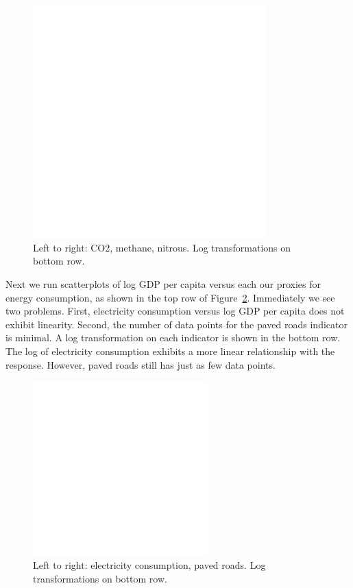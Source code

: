 \documentclass[11pt]{article}
\begin{document}
\begin{figure}[!ht]
  \centering
  \includegraphics[width=0.8\textwidth]{images/climate_model_scatter_pollution}
  \caption{\label{climate_model_scatter_pollution}Left to right: CO2, methane, nitrous. Log transformations on bottom row.}
\end{figure}

Next we run scatterplots of log GDP per capita versus each our proxies for energy consumption, as shown in the top row of Figure~\ref{climate_model_scatter_elec_roads}. Immediately we see two problems. First, electricity consumption versus log GDP per capita does not exhibit linearity. Second, the number of data points for the paved roads indicator is minimal. A log transformation on each indicator is shown in the bottom row. The log of electricity consumption exhibits a more linear relationship with the response. However, paved roads still has just as few data points.

\begin{figure}[!ht]
  \centering
  \includegraphics[width=0.6\textwidth]{images/climate_model_scatter_elec_roads}
  \caption{\label{climate_model_scatter_elec_roads}Left to right: electricity consumption, paved roads. Log transformations on bottom row.}
\end{figure}
\end{document}

